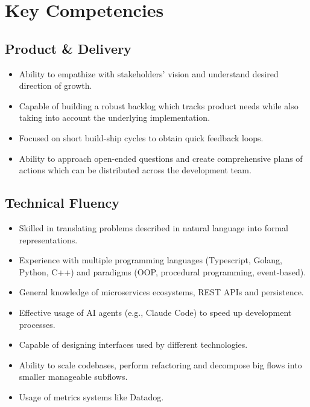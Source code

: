 \documentclass[a4paper]{article}
\begin{document}
\section*{Key Competencies}

\subsection*{Product \& Delivery}
\begin{itemize}
  \item Ability to empathize with stakeholders' vision and understand desired direction of growth.
  \item Capable of building a robust backlog which tracks product needs while also taking into
    account the underlying implementation.
  \item Focused on short build-ship cycles to obtain quick feedback loops.
  \item Ability to approach open-ended questions and create comprehensive plans of
  actions which can be distributed across the development team.
\end{itemize}

\subsection*{Technical Fluency}
\begin{itemize}
  \item Skilled in translating problems described in natural language into
    formal representations.
  \item Experience with multiple programming languages (Typescript, Golang,
    Python, C++) and paradigms (OOP, procedural programming, event-based).
  \item General knowledge of microservices ecosystems, REST APIs and persistence.
  \item Effective usage of AI agents (e.g., Claude Code) to speed up
    development processes.
  \item Capable of designing interfaces used by different technologies.
  \item Ability to scale codebases, perform refactoring and decompose big flows
    into smaller manageable subflows.
  \item Usage of metrics systems like Datadog.
\end{itemize}
\end{document}

